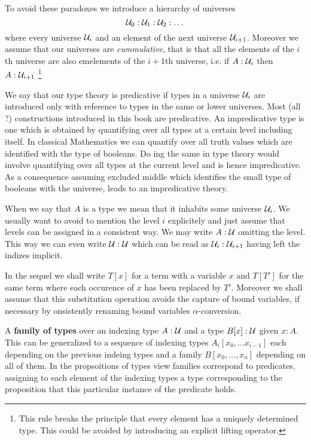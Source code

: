 {To avoid these paradoxes we introduce a hierarchy of universes
\[ \mathcal{U}_0 : \mathcal{U}_1 : \mathcal{U}_2 : \dots \]
where every universe $\mathcal{U}_i$ and an element of the next universe
$\mathcal{U}_{i+1}$. Moreover we assume that our universes are
\emph{cummulative}, that is that all the elements of the $i$th
universe are also emelements of the $i+1$th universe, i.e. if
$A:\mathcal{U}_i$ then $A:\mathcal{U}_{i+1}$
\footnote{This rule breaks the principle that every element
  has a uniquely determined type. This could be avoided by introducing
  an explicit lifting operator.}

We say that our type theory is predicative if types in a universe
$\mathcal{U}_i$ are introduced only with reference to types in the same or
lower universes. Most (all ?) constructions introduced in this book
are predicative. An impredicative type is one which is obtained by
quantifying over all types at a certain level including itself. In
classical Mathematics we can quantify over all truth values which are
identified with the type of booleans. Do ing the same in type theory
would involve quantifying over all types at the current level and is
hence impredicative. As a consequence assuming excluded middle which
identifies the small type of booleans with the universe, leads to an
impredicative theory.

When we say that $A$ is a type we mean that it inhabits some universe
$\mathcal{U}_i$. We usually want to avoid to mention the level $i$ explicitely
and just assume that levels can be assigned in a consistent way. We
may write $A:\mathcal{U}$ omitting the level. This way we can even write
$\mathcal{U}:\mathcal{U}$ which can be read as $\mathcal{U}_i:\mathcal{U}_{i+1}$ having left the
indizes implicit. 

In the sequel we shall write $T[x]$ for a term with a variable $x$ and
$T[T']$ for the same term where each occurence of $x$ has been
replaced by $T'$. Moreover we shall assume that this substitution
operation avoids the capture of bound variables, if necessary by
onsistently renaming bound variables $\alpha$-conversion.

A \textbf{family of types} over an indexing type $A:\mathcal{U}$ and a 
type $B[x] : \mathcal{U}$ given $x:A$. This can be generalized to a sequence of indexing
types $A_i[x_0,\dots x_{i-1}]$ each depending on the previous indeing
types and a family $B[x_0,\dots,x_n]$ depending on all of them. In the
propsoitions of types view families correspond to predicates,
assigning to each element of the indexing types a type corresponding
to the proposition that this particular instance of the predicate holds.

}
